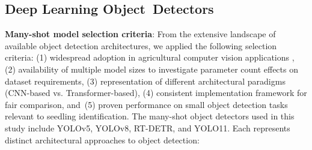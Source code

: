 \documentclass[12pt,a4paper,oneside]{report}
\begin{document}
\subsection{Deep Learning Object~Detectors}

\textbf{Many-shot model selection criteria}: %
From the extensive landscape of available object detection architectures, we 
applied the following selection criteria: (1) widespread adoption in agricultural 
computer vision applications \cite{badgujarAgriculturalObjectDetection2024}, 
(2) availability of multiple model sizes to investigate parameter count effects 
on dataset requirements, (3) representation of different architectural paradigms 
(CNN-based vs. Transformer-based), (4) consistent implementation framework for 
fair comparison, and~(5) proven performance on small object detection tasks 
relevant to seedling identification.
The many-shot object detectors used in this study include YOLOv5, YOLOv8, RT-DETR, 
and YOLO11. Each represents distinct architectural approaches to object detection:
\end{document}
